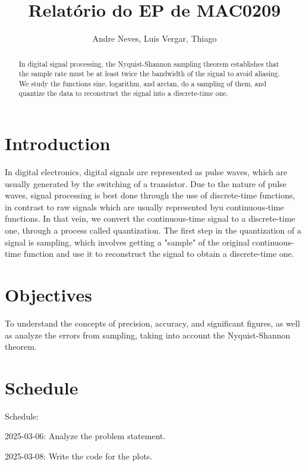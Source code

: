 \documentclass{article}
\title{Relatório do EP de MAC0209}
\author{Andre Neves, Luis Vergar, Thiago}
\begin{document}
\maketitle


\begin{abstract}
In digital signal processing, the Nyquist-Shannon sampling theorem establishes that the sample rate must be at least twice the bandwidth of the signal to avoid aliasing. 
We study the functions sine, logarithm, and arctan, do a sampling of them, and quantize the data to reconstruct the signal into a discrete-time one. 

\end{abstract}

\newpage

\tableofcontents

\newpage

\section{Introduction}

In digital electronics, digital signals are represented as pulse waves, which are usually generated by the switching of a transistor. 
Due to the nature of pulse waves, signal processing is best done through the use of discrete-time functions, in contrast to raw signals which are usually represented byu continuous-time functions. 
In that vein, we convert the continuous-time signal to a discrete-time one, through a process called quantization. 
The first step in the quantization of a signal is sampling, which involves getting a "sample" of the original continuous-time function and use it to reconstruct the signal to obtain a discrete-time one. 

\section{Objectives}

To understand the concepts of precision, accuracy, and significant figures, as well as analyze the errors from sampling, taking into account the Nyquist-Shannon theorem. 

\section{Schedule}

Schedule:  

2025-03-06: Analyze the problem statement.  

2025-03-08: Write the code for the plots.  
\end{document}
